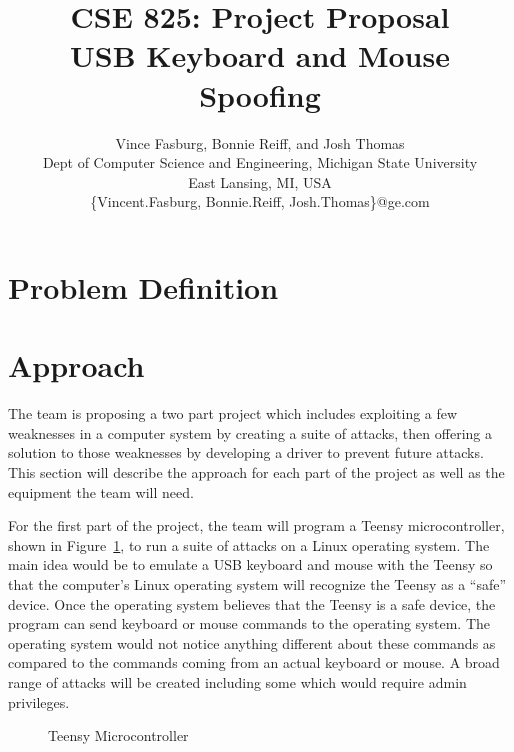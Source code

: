 \documentclass{ieee}
\begin{document}
\title{CSE 825: Project Proposal \\
USB Keyboard and Mouse Spoofing\\
}

\author{Vince Fasburg, Bonnie Reiff, and Josh Thomas\\
Dept of Computer Science and Engineering, Michigan State University\\
East Lansing, MI, USA\\
\{Vincent.Fasburg, Bonnie.Reiff, Josh.Thomas\}@ge.com\\
}

\maketitle
\thispagestyle{empty}

\section{Problem Definition}

\section{Approach}

The team is proposing a two part project which includes exploiting a few weaknesses in a computer system by creating a suite of attacks, then offering a solution to those weaknesses by developing a driver to prevent future attacks. This section will describe the approach for each part of the project as well as the equipment the team will need.

For the first part of the project, the team will program a Teensy microcontroller, shown in Figure~\ref{fig:Teensy}, to run a suite of attacks on a Linux operating system. The main idea would be to emulate a USB keyboard and mouse with the Teensy so that the computer’s Linux operating system will recognize the Teensy as a “safe” device. Once the operating system believes that the Teensy is a safe device, the program can send keyboard or mouse commands to the operating system. The operating system would not notice anything different about these commands as compared to the commands coming from an actual keyboard or mouse. A broad range of attacks will be created including some which would require admin privileges.

\begin{figure}[H]
   \caption{Teensy Microcontroller}
   \label{fig:Teensy}
\end{figure}
\end{document}
